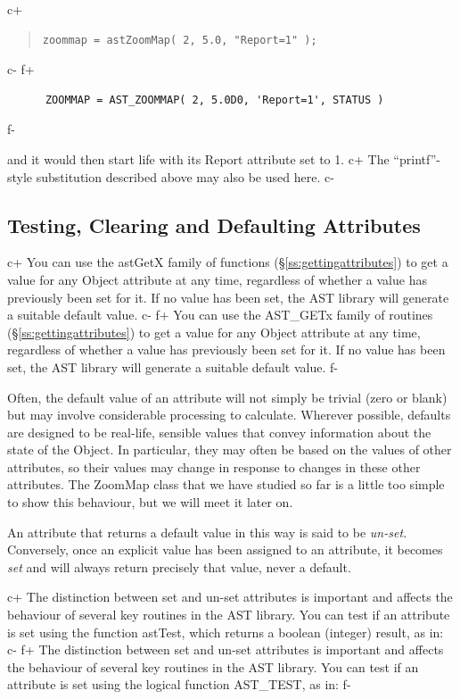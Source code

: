 \documentclass[twoside,11pt]{article}
\newcommand{\secref}[1]{\S\ref{#1}}
\newcommand{\secref}[1]{\ref{#1}}
\begin{document}
c+
\begin{quote}
\small
\begin{verbatim}
zoommap = astZoomMap( 2, 5.0, "Report=1" );
\end{verbatim}
\normalsize
\end{quote}
c-
f+
\small
\begin{verbatim}
      ZOOMMAP = AST_ZOOMMAP( 2, 5.0D0, 'Report=1', STATUS )
\end{verbatim}
\normalsize
f-

and it would then start life with its Report attribute set to 1.
c+
The ``printf''-style substitution described above may also be used
here.
c-

\subsection{\label{ss:defaultingattributes}Testing, Clearing and Defaulting Attributes}

c+
You can use the astGetX family of functions
(\secref{ss:gettingattributes}) to get a value for any Object attribute
at any time, regardless of whether a value has previously been set for
it. If no value has been set, the AST library will generate a suitable
default value.
c-
f+
You can use the AST\_GETx family of routines
(\secref{ss:gettingattributes}) to get a value for any Object attribute
at any time, regardless of whether a value has previously been set for
it. If no value has been set, the AST library will generate a suitable
default value.
f-

Often, the default value of an attribute will not simply be trivial
(zero or blank) but may involve considerable processing to
calculate. Wherever possible, defaults are designed to be real-life,
sensible values that convey information about the state of the
Object. In particular, they may often be based on the values of other
attributes, so their values may change in response to changes in these
other attributes. The ZoomMap class that we have studied so far is a
little too simple to show this behaviour, but we will meet it later
on.

An attribute that returns a default value in this way is said to be
{\em{un-set.}} Conversely, once an explicit value has been assigned to
an attribute, it becomes {\em{set}} and will always return precisely
that value, never a default.

c+
The distinction between set and un-set attributes is important and
affects the behaviour of several key routines in the AST library. You
can test if an attribute is set using the function astTest, which
returns a boolean (integer) result, as in:
c-
f+
The distinction between set and un-set attributes is important and
affects the behaviour of several key routines in the AST library. You
can test if an attribute is set using the logical function AST\_TEST,
as in:
f-
\end{document}
